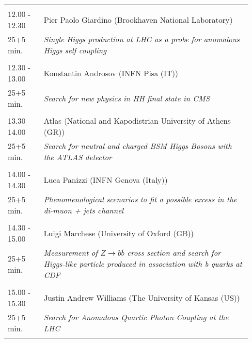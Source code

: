 \begin{longtable}{p{3cm}p{13cm}}
 & \\ 
12.00 - 12.30 & Pier Paolo Giardino (Brookhaven National Laboratory)\\ 
25+5 min. & {\it Single Higgs production at LHC as a probe for anomalous Higgs self coupling}\\ 
 & \\ 
12.30 - 13.00 & Konstantin Androsov (INFN Pisa (IT))\\ 
25+5 min. & {\it Search for new physics in HH final state in CMS}\\ 
 & \\ 
13.30 - 14.00 & Atlas (National and Kapodistrian University of Athens (GR))\\ 
25+5 min. & {\it Search for neutral and charged BSM Higgs Bosons with the ATLAS detector}\\ 
 & \\ 
14.00 - 14.30 & Luca Panizzi (INFN Genova (Italy))\\ 
25+5 min. & {\it Phenomenological scenarios to fit a possible excess in the di-muon + jets channel}\\ 
 & \\ 
14.30 - 15.00 & Luigi Marchese (University of Oxford (GB))\\ 
25+5 min. & {\it Measurement of $Z \rightarrow b\bar{b}$ cross section and search for Higgs-like particle produced in association with b quarks at CDF}\\ 
 & \\ 
15.00 - 15.30 & Justin Andrew Williams (The University of Kansas (US))\\ 
25+5 min. & {\it Search for Anomalous Quartic Photon Coupling at the LHC}\\ 
 & \\ 
\end{longtable}

